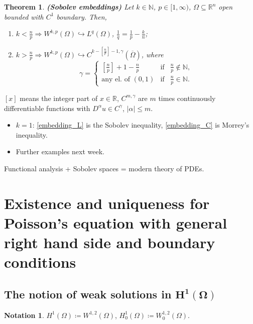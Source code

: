\documentclass[12pt]{article}
\newtheorem{theorem}{Theorem}[section]
\theoremstyle{definition}
\newtheorem*{notation}{Notation}
\begin{document}
\begin{theorem}\label{Sobolev_embeddings}
\emph{\textbf{(Sobolev embeddings)}} Let $k\in\mathbb{N}$, $p\in[1,\infty)$, $\Omega\subseteq\mathbb{R}^n$ open bounded with $C^1$ boundary. Then,
\begin{enumerate}[label=\alph*)]
\item\label{embedding_L} $k<\frac{n}{p}\Longrightarrow W^{k,p}(\Omega)\hookrightarrow L^q(\Omega)$, $\frac{1}{q}=\frac{1}{p}-\frac{k}{n}$;
\item\label{embedding_C} $k>\frac{n}{p}\Longrightarrow W^{k,p}(\Omega)\hookrightarrow C^{k-\left[\frac{n}{p}\right]-1,\gamma}(\overline{\Omega})$, where
\[\gamma=\left\{\begin{array}{rcl}\left[\frac{n}{p}\right]+1-\frac{n}{p}&\text{if}&\frac{n}{p}\notin\mathbb{N},\\\text{any el. of }(0,1)&\text{if}&\frac{n}{p}\in\mathbb{N}.\end{array}\right.\]
\end{enumerate}
\end{theorem}

$[x]$ means the integer part of $x\in\mathbb{R}$, $C^{m,\gamma}$ are $m$ times continuously differentiable functions with $D^{\alpha}u\in C^{\gamma}$, $|\alpha|\leq m$.

\begin{itemize}
\item $k=1$: \ref{embedding_L} is the Sobolev inequality, \ref{embedding_C} is Morrey's inequality.

\item Further examples next week.
\end{itemize}

Functional analysis + Sobolev spaces = modern theory of PDEs.
\section{Existence and uniqueness for Poisson's equation with general \texorpdfstring{right hand side and boundary conditions}{RHS and BC}}\label{Poisson_general}
\subsection[The notion of weak solutions in \texorpdfstring{$H^1(\Omega)$}{H1}]{The notion of weak solutions in \texorpdfstring{$\boldsymbol{H^1(\Omega)}$}{H1}}
\begin{notation}
$H^1(\Omega)\coloneqq W^{1,2}(\Omega)$, $H_0^1(\Omega)\coloneqq W_0^{1,2}(\Omega)$.
\end{notation}
\end{document}
